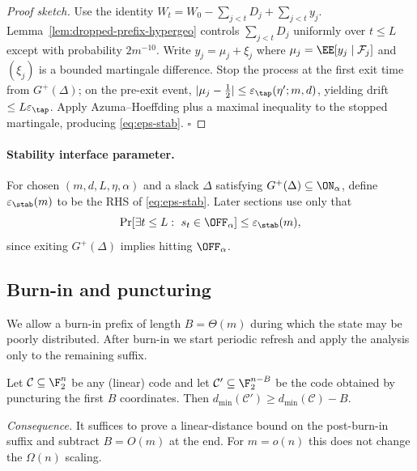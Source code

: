 \begin{proof}[Proof sketch]
Use the identity \(W_t=W_0-\sum_{j<t}D_j+\sum_{j<t}y_j\).
Lemma~\ref{lem:dropped-prefix-hypergeo} controls \(\sum_{j<t}D_j\) uniformly over \(t\le L\)
except with probability \(2m^{-10}\).
Write \(y_j=\mu_j+\xi_j\) where \(\mu_j=\EE[y_j\mid\mathcal{F}_j]\) and \((\xi_j)\) is a bounded martingale difference.
Stop the process at the first exit time from \(G^+(\Delta)\); on the pre-exit event,
\(|\mu_j-\tfrac12|\le \varepsilon_{\tap}(\eta';m,d)\), yielding drift \(\le L\varepsilon_{\tap}\).
Apply Azuma--Hoeffding plus a maximal inequality to the stopped martingale, producing \eqref{eq:eps-stab}. \(\square\)
\end{proof}

\paragraph{Stability interface parameter.}
For chosen \((m,d,L,\eta,\alpha)\) and a slack \(\Delta\) satisfying \(G^+(\Delta)\subseteq \ON_\alpha\),
define \(\varepsilon_{\stab}(m)\) to be the RHS of \eqref{eq:eps-stab}. Later sections use only that
\[
\Pr[\exists t\le L:\ s_t\in \OFF_\alpha]\le \varepsilon_{\stab}(m),
\]
since exiting \(G^+(\Delta)\) implies hitting \(\OFF_\alpha\).

\subsection{Burn-in and puncturing}
\label{sec:burn-in-puncture-inner}

We allow a burn-in prefix of length \(B=\Theta(m)\) during which the state may be poorly distributed.
After burn-in we start periodic refresh and apply the analysis only to the remaining suffix.

\begin{lemma}
\label{lem:puncture-prefix}
Let \(\mathcal{C}\subseteq\F_2^n\) be any (linear) code and let \(\mathcal{C}'\subseteq\F_2^{n-B}\) be the code obtained
by puncturing the first \(B\) coordinates. Then \(d_{\min}(\mathcal{C}')\ge d_{\min}(\mathcal{C})-B\).
\end{lemma}

\noindent
\emph{Consequence.}
It suffices to prove a linear-distance bound on the post-burn-in suffix and subtract \(B=O(m)\) at the end.
For \(m=o(n)\) this does not change the \(\Omega(n)\) scaling.

